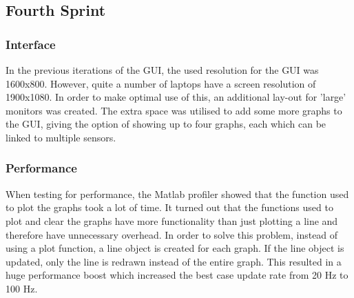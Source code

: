 \subsection{Fourth Sprint}

\subsubsection{Interface}
In the previous iterations of the GUI, the used resolution for the GUI was 1600x800. However, quite a number of laptops have a screen resolution of 1900x1080. In order to make optimal use of this, an additional lay-out for 'large' monitors was created. The extra space was utilised to add some more graphs to the GUI, giving the option of showing up to four graphs, each which can be linked to multiple sensors. 

\subsubsection{Performance}
When testing for performance, the Matlab profiler showed that the function used to plot the graphs took a lot of time. It turned out that the functions used to plot and clear the graphs have more functionality than just plotting a line and therefore have 	unnecessary overhead. In order to solve this problem, instead of using a plot function, a line object is created for each graph. If the line object is updated, only the line is redrawn instead of the entire graph. This resulted in a huge performance boost which increased the best case update rate from 20 Hz to 100 Hz.\\

